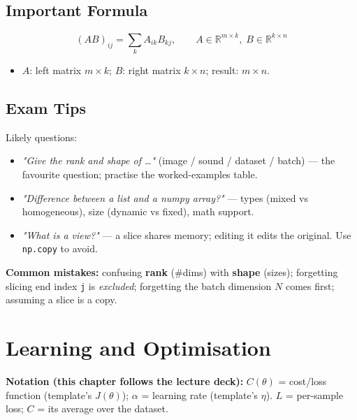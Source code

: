 \documentclass[10pt,a4paper]{article}
\begin{document}
	\subsection{Important Formula}

	\begin{formulabox}
		\[
		(A B)_{ij} = \sum_{k} A_{ik} B_{kj}, \qquad A \in \mathbb{R}^{m\times k},\; B \in \mathbb{R}^{k\times n}
		\]
	\end{formulabox}
	\begin{itemize}[leftmargin=*]
		\item $A$: left matrix $m\times k$; \quad $B$: right matrix $k\times n$; \quad result: $m\times n$.
	\end{itemize}

	\subsection{Exam Tips}

	\begin{examtipbox}
		Likely questions:
		\begin{itemize}[leftmargin=*]
			\item \emph{"Give the rank and shape of \dots"} (image / sound / dataset / batch) --- the favourite question; practise the worked-examples table.
			\item \emph{"Difference between a list and a numpy array?"} --- types (mixed vs homogeneous), size (dynamic vs fixed), math support.
			\item \emph{"What is a view?"} --- a slice shares memory; editing it edits the original. Use \texttt{np.copy} to avoid.
		\end{itemize}
		\textbf{Common mistakes:} confusing \textbf{rank} (\#dims) with \textbf{shape} (sizes); forgetting slicing end index \texttt{j} is \emph{excluded}; forgetting the batch dimension $N$ comes first; assuming a slice is a copy.
	\end{examtipbox}
	
	\section{Learning and Optimisation}
	
	\begin{importantbox}
		\textbf{Notation (this chapter follows the lecture deck):} $C(\theta)$ = cost/loss function (template's $J(\theta)$); $\alpha$ = learning rate (template's $\eta$). $L$ = per-sample loss; $C$ = its average over the dataset.
	\end{importantbox}
\end{document}
